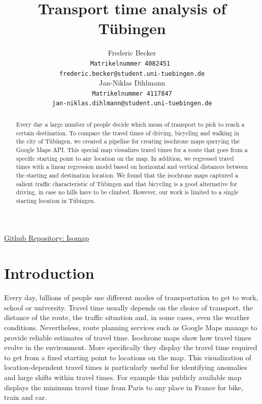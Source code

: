 \documentclass{article}
\title{Transport time analysis of Tübingen}
\author{%
  Frederic Becker\\
  \texttt{\small Matrikelnummer 4082451 }\\
  \texttt{\scriptsize frederic.becker@student.uni-tuebingen.de} \\
  \And
  Jan-Niklas Dihlmann\\
  \texttt{\small Matrikelnummer 4117847}\\
  \texttt{\scriptsize jan-niklas.dihlmann@student.uni-tuebingen.de} \\
}
\begin{document}
\maketitle

\begin{abstract}
   Every day a large number of people decide which mean of transport to pick to reach a certain destination. To compare the travel times of driving, bicycling and walking in the city of Tübingen, we created a pipeline for creating isochrone maps querying the Google Maps API. This special map visualizes travel times for a route that goes from a specific starting point to any location on the map. In addition, we regressed travel times with a linear regression model based on horizontal and vertical distances between the starting and destination location. We found that the isochrone maps captured a salient traffic characteristic of Tübingen and that bicycling is a good alternative for driving, in case no hills have to be climbed. However, our work is limited to a single starting location in Tübingen.  
\end{abstract}

\begin{center}
    \href{https://github.com/JDihlmann/isomap}{Github Repository: Isomap} 
\end{center}

\section{Introduction}
Every day, billions of people use different modes of transportation to get to work, school or university. Travel time usually depends on the choice of transport, the distance of the route, the traffic situation and, in some cases, even the weather conditions. Nevertheless, route planning services such as Google Maps \cite{googleMaps} manage to provide reliable estimates of travel time. Isochrone maps show how travel times evolve in the environment. More specifically they display the travel time required to get from a fixed starting point to locations on the map. This visualization of location-dependent travel times is particularly useful for identifying anomalies and large shifts within travel times. For example this publicly available map \cite{redditMap} displays the minimum travel time from Paris to any place in France for bike, train and car. 
\end{document}
